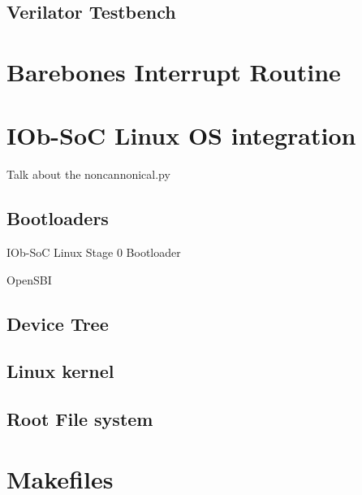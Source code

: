 \subsection{Verilator Testbench}

\section{Barebones Interrupt Routine}
\label{section:barebones_interrupt_routine}

\section{IOb-SoC Linux OS integration}
\label{section:linux_os_integration}
Talk about the noncannonical.py

\subsection{Bootloaders}
IOb-SoC Linux Stage 0 Bootloader

OpenSBI

\subsection{Device Tree}

\subsection{Linux kernel}

\subsection{Root File system}

\section{Makefiles}